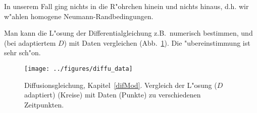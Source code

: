 



In unserem Fall ging nichts in die R"ohrchen hinein und nichts hinaus, d.h.
wir w"ahlen homogene Neumann-Randbedingungen.\par
Man kann die  L"osung der Differentialgleichung z.B.\ numerisch bestimmen, und (bei adaptiertem $D$)
mit Daten vergleichen (Abb.~\ref{difDat}). Die "ubereinstimmung ist sehr sch"on.


\begin{figure}[htbp] %
   \centering
   \texttt{[image: ../figures/diffu\_data]} 
   \caption{Diffusionsgleichung, Kapitel~\ref{difMod}. Vergleich der L"osung ($D$ adaptiert) (Kreise) mit Daten 
(Punkte) zu verschiedenen Zeitpunkten. }
\label{difDat}
\end{figure}

